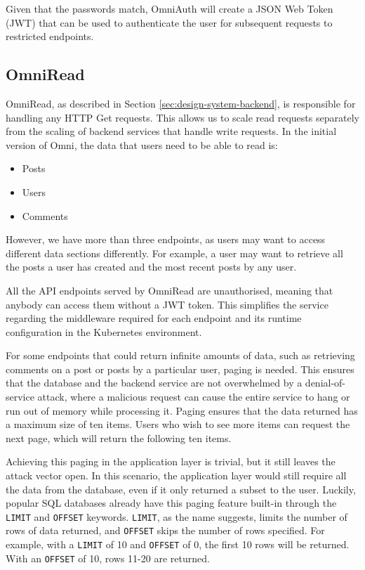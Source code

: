 Given that the passwords match, OmniAuth will create a JSON Web Token (JWT) that can be used to authenticate the user for subsequent requests to restricted endpoints.

\subsection{OmniRead}
OmniRead, as described in Section \ref{sec:design-system-backend}, is responsible for handling any HTTP Get requests. This allows us to scale read requests separately from the scaling of backend services that handle write requests.
In the initial version of Omni, the data that users need to be able to read is: 
\begin{itemize}
    \item Posts
    \item Users
    \item Comments
\end{itemize}
However, we have more than three endpoints, as users may want to access different data sections differently. For example, a user may want to retrieve all the posts a user has created and the most recent posts by any user. 

All the API endpoints served by OmniRead are unauthorised, meaning that anybody can access them without a JWT token. This simplifies the service regarding the middleware required for each endpoint and its runtime configuration in the Kubernetes environment. 

For some endpoints that could return infinite amounts of data, such as retrieving comments on a post or posts by a particular user, paging is needed.
This ensures that the database and the backend service are not overwhelmed by a denial-of-service attack, where a malicious request can cause the entire service to hang or run out of memory while processing it. 
Paging ensures that the data returned has a maximum size of ten items. Users who wish to see more items can request the next page, which will return the following ten items.

Achieving this paging in the application layer is trivial, but it still leaves the attack vector open. In this scenario, the application layer would still require all the data from the database, even if it only returned a subset to the user. 
Luckily, popular SQL databases already have this paging feature built-in through the \verb|LIMIT| and \verb|OFFSET| keywords.
\verb|LIMIT|, as the name suggests, limits the number of rows of data returned, and \verb|OFFSET| skips the number of rows specified.
For example, with a \verb|LIMIT| of 10 and \verb|OFFSET| of 0, the first 10 rows will be returned. With an \verb|OFFSET| of 10, rows 11-20 are returned. 

